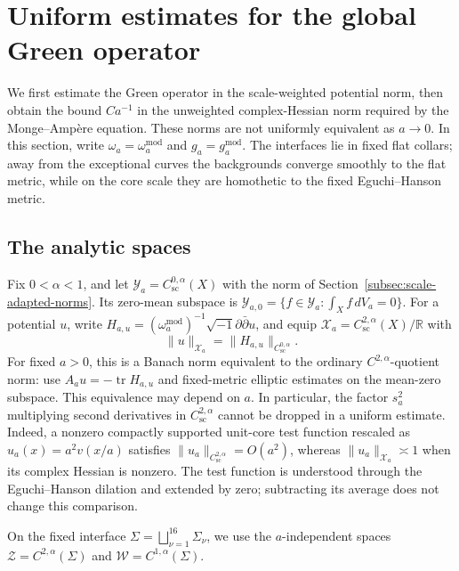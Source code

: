 \documentclass[11pt,a4paper,twoside]{article}
\numberwithin{equation}{section}
\newcommand{\ddc}{\sqrt{-1}\partial\bar\partial}
\theoremstyle{definition}
\theoremstyle{remark}
\begin{document}
\section{Uniform estimates for the global Green operator}
\label{sec:green-estimates}

We first estimate the Green operator in the scale-weighted potential
norm, then obtain the bound \(Ca^{-1}\) in the unweighted
complex-Hessian norm required by the Monge--Amp\`ere equation.
These norms are not uniformly equivalent as \(a\to0\). 
In this section, write \(\omega_a=\omega_a^{\mathrm{mod}}\) and \(g_a=g_a^{\mathrm{mod}}\). The
interfaces lie in fixed flat collars; away from the exceptional
curves the backgrounds converge smoothly to the flat metric, while
on the core scale they are homothetic to the fixed Eguchi--Hanson
metric.

\subsection{The analytic spaces}
\label{subsec:analytic-spaces}

Fix \(0<\alpha<1\), and let \(\mathcal Y_a=C_{\mathrm{sc}}^{0,\alpha}(X)\)
with the norm of Section~\ref{subsec:scale-adapted-norms}. Its
zero-mean subspace is
\(\mathcal Y_{a,0}=\{f\in\mathcal Y_a:\int_Xf\,dV_a=0\}\).
For a potential \(u\), write
\(H_{a,u}=(\omega_a^{\mathrm{mod}})^{-1}\ddc u\), and equip
\(\mathcal X_a=C_{\mathrm{sc}}^{2,\alpha}(X)/\mathbb R\) with
\begin{equation}\label{eq:Xa-norm}
\|u\|_{\mathcal X_a}=\|H_{a,u}\|_{C_{\mathrm{sc}}^{0,\alpha}}.
\end{equation}
For fixed \(a>0\), this is a Banach norm equivalent to the ordinary
\(C^{2,\alpha}\)-quotient norm: use
\(A_au=-\operatorname{tr}H_{a,u}\) and fixed-metric elliptic
estimates on the mean-zero subspace. This equivalence may depend on
\(a\). In particular, the factor \(s_a^2\) multiplying second
derivatives in \(C_{\mathrm{sc}}^{2,\alpha}\) cannot be dropped in
a uniform estimate. Indeed, a nonzero compactly supported unit-core
test function rescaled as \(u_a(x)=a^2v(x/a)\) satisfies
\(\|u_a\|_{C_{\mathrm{sc}}^{2,\alpha}}=O(a^2)\), whereas
\(\|u_a\|_{\mathcal X_a}\asymp1\) when its complex Hessian is
nonzero. The test function is understood through the Eguchi--Hanson
dilation and extended by zero; subtracting its average does not
change this comparison.

On the fixed interface
\(\Sigma=\bigsqcup_{\nu=1}^{16}\Sigma_\nu\), we use the
\(a\)-independent spaces \(\mathcal Z=C^{2,\alpha}(\Sigma)\) and
\(\mathcal W=C^{1,\alpha}(\Sigma)\).
\end{document}

